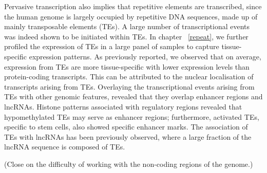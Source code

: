 Pervasive transcription also implies that repetitive elements are transcribed, since the human genome is largely occupied by repetitive DNA sequences, made up of mainly transposable elements (TEs). A large number of transcriptional events was indeed shown to be initiated within TEs\cite{pmid19377475}. In chapter ~\ref{repeat}, we further profiled the expression of TEs in a large panel of samples to capture tissue-specific expression patterns. As previously reported, we observed that on average, expression from TEs are more tissue-specific with lower expression levels than protein-coding transcripts. This can be attributed to the nuclear localisation of transcripts arising from TEs\cite{pmid24777452}. Overlaying the transcriptional events arising from TEs with other genomic features, revealed that they overlap enhancer regions and lncRNAs. Histone patterns associated with regulatory regions revealed that hypomethylated TEs may serve as enhancer regions\cite{pmid23708189}; furthermore, activated TEs, specific to stem cells, also showed specific enhancer marks\cite{pmid24777452}. The association of TEs with lncRNAs has been previously observed, where a large fraction of the lncRNA sequence is composed of TEs\cite{pmid25218058, pmid23181609}.

(Close on the difficulty of working with the non-coding regions of the genome.)
